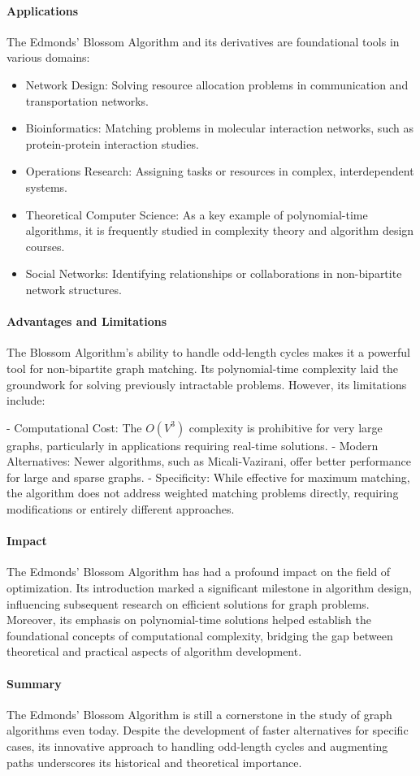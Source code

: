 \paragraph{Applications}
The Edmonds' Blossom Algorithm and its derivatives are foundational tools in various domains:
\begin{itemize}
    \item Network Design: Solving resource allocation problems in communication and transportation networks.
    \item Bioinformatics: Matching problems in molecular interaction networks, such as protein-protein interaction studies.
    \item Operations Research: Assigning tasks or resources in complex, interdependent systems.
    \item Theoretical Computer Science: As a key example of polynomial-time algorithms, it is frequently studied in complexity theory and algorithm design courses.
    \item Social Networks: Identifying relationships or collaborations in non-bipartite network structures.
\end{itemize}

\paragraph{Advantages and Limitations}
The Blossom Algorithm’s ability to handle odd-length cycles makes it a powerful tool for non-bipartite graph matching. Its polynomial-time complexity laid the groundwork for solving previously intractable problems. However, its limitations include:

- Computational Cost: The \(O(V^3)\) complexity is prohibitive for very large graphs, particularly in applications requiring real-time solutions.
- Modern Alternatives: Newer algorithms, such as Micali-Vazirani, offer better performance for large and sparse graphs.
- Specificity: While effective for maximum matching, the algorithm does not address weighted matching problems directly, requiring modifications or entirely different approaches.

\paragraph{Impact}
The Edmonds' Blossom Algorithm has had a profound impact on the field of  optimization. Its introduction marked a significant milestone in algorithm design, influencing subsequent research on efficient solutions for graph problems. Moreover, its emphasis on polynomial-time solutions helped establish the foundational concepts of computational complexity, bridging the gap between theoretical and practical aspects of algorithm development.

\paragraph{Summary}
The Edmonds' Blossom Algorithm is still a cornerstone in the study of graph algorithms even today. Despite the development of faster alternatives for specific cases, its innovative approach to handling odd-length cycles and augmenting paths underscores its historical and theoretical importance.
